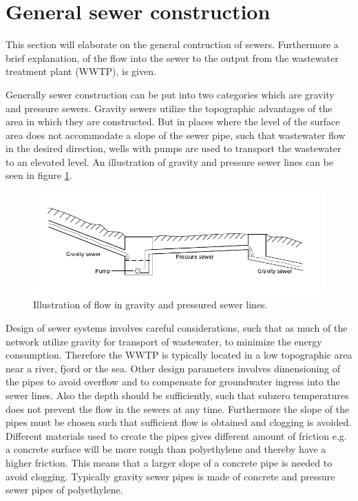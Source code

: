 \section{General sewer construction}\label{se:sewer_construction}
This section will elaborate on the general contruction of sewers. Furthermore a brief explanation, of the flow into the sewer to the output from the wastewater treatment plant (WWTP), is given.


Generally sewer construction can be put into two categories which are gravity and pressure sewers. Gravity sewers utilize the topographic advantages of the area in which they are constructed. But in places where the level of the surface area does not accommodate a slope of the sewer pipe, such that wastewater flow in the desired direction, wells with pumps are used to transport the wastewater to an elevated level. An illustration of gravity and pressure sewer lines can be seen in figure \ref{fig:Sewer_drawing}. 

\begin{figure}[H]
\centering
\includegraphics[width=1\textwidth]{report/introduction/pictures/Sewer_drawing.pdf}
\caption{Illustration of flow in gravity and pressured sewer lines.}
\label{fig:Sewer_drawing}
\end{figure}

Design of sewer systems involves careful considerations, such that as much of the network utilize gravity for transport of wastewater, to minimize the energy consumption. Therefore the WWTP is typically located in a low topographic area near a river, fjord or the sea. Other design parameters involves dimensioning of the pipes to avoid overflow and to compensate for groundwater ingress into the sewer lines.
Also the depth should be sufficiently, such that subzero temperatures does not prevent the flow in the sewers at any time. Furthermore the slope of the pipes must be chosen such that sufficient flow is obtained and clogging is avoided. Different materials used to create the pipes gives different amount of friction e.g. a concrete surface will be more rough than polyethylene and thereby have a higher friction. This means that a larger slope of a concrete pipe is needed to avoid clogging. Typically gravity sewer pipes is made of concrete and pressure sewer pipes of polyethylene.

